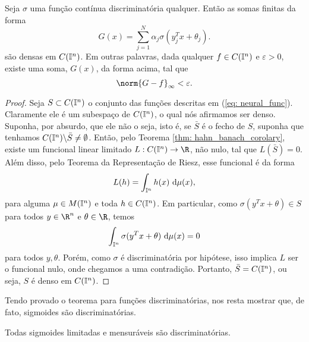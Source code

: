 \begin{TAU}
    Seja \( \sigma \) uma função contínua discriminatória qualquer.
    Então as somas finitas da forma
    \begin{equation}
        G(x) = \sum_{ j=1 }^{ N } \alpha_{ j } \sigma(y_{ j }^{ T }x + \theta_{ j })
        \label{eq: neural_func}
    .\end{equation}
    são densas em \( C(\mathbb{I}^{ n }) \).
    Em outras palavras, dada qualquer \( f \in C(\mathbb{I}^{ n }) \) e \( \varepsilon > 0 \), existe uma soma, \( G(x) \), da forma acima, tal que \[
        \norm{ G - f }_{ \infty } < \varepsilon
    .\]
\end{TAU}

\begin{proof}
    Seja \( S \subset C(\mathbb{I}^{ n }) \) o conjunto das funções descritas em (\ref{eq: neural_func}).
    Claramente ele é um subespaço de \( C(\mathbb{I}^{ n }) \), o qual nós afirmamos ser denso.
    Suponha, por absurdo, que ele não o seja, isto é, se \( \bar{S} \) é o fecho de \( S \), suponha que tenhamos \( C(\mathbb{I}^{ n }) \backslash \bar{S} \neq \emptyset \).
    Então, pelo Teorema \ref{thm: hahn_banach_corolary}, existe um funcional linear limitado \( L : C(\I^{ n }) \to \R \), não nulo, tal que \( L(\bar{S}) = 0 \).
    Além disso, pelo Teorema da Representação de Riesz, esse funcional é da forma \[
        L(h)
        = \int_{ \mathbb{I}^{ n } } h(x) \ \mathrm{d}\mu(x)
    ,\]
    para alguma \( \mu \in M(\mathbb{I}^{ n }) \) e toda \( h \in C(\mathbb{I}^{ n }) \).
    Em particular, como \( \sigma(y^{ T }x + \theta) \in S \) para todos \( y \in \R^{ n } \) e \( \theta \in \R \), temos \[
        \int_{ \I^{ n } } \sigma(y^{ T }x + \theta) \ \mathrm{d}\mu(x) = 0
    \]
    para todos \( y, \theta \).
    Porém, como \( \sigma \) é discriminatória por hipótese, isso implica \( L \) ser o funcional nulo, onde chegamos a uma contradição.
    Portanto, \( \bar{S} = C(\mathbb{I}^{ n }) \), ou seja, \( S \) é denso em \( C(\mathbb{I}^{ n }) \).
\end{proof}

Tendo provado o teorema para funções discriminatórias, nos resta mostrar que, de fato, sigmoides são discriminatórias.

\begin{lem}
    Todas sigmoides limitadas e mensuráveis são discriminatórias.
\end{lem}

